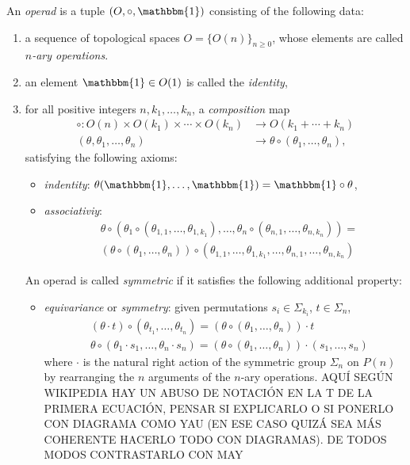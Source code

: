 \documentclass[TFM.tex]{subfiles}
\begin{document}
\begin{defi}
An \emph{operad} is a tuple $(O, \circ, \mathbbm{1})$ consisting of the following data:
\begin{enumerate}[(1)]
\item a sequence of topological spaces $O=\{O(n)\}_{n\geq 0}$, whose elements are called \emph{$n$-ary operations}.
\item an element $\mathbbm{1}\in O(1)$ is called the \emph{identity},
\item for all positive integers $n,k_1,\dots, k_n$, a \emph{composition} map
\begin{align*}
\circ:O(n)\times O(k_1)\times\cdots\times O(k_n)&\to O(k_1+\cdots+k_n)\\
(\theta, \theta_1,\dots, \theta_n)&\to \theta\circ(\theta_1,\dots, \theta_n),
\end{align*}
satisfying the following axioms:
\begin{itemize}
\item \emph{indentity}: $\theta(\mathbbm{1},\dots, \mathbbm{1})=\mathbbm{1}\circ\theta$,
\item \emph{associativiy}:
\begin{align*}
& \theta \circ (\theta_1 \circ (\theta_{1,1}, \ldots, \theta_{1,k_1}), \ldots, \theta_n \circ (\theta_{n,1}, \ldots,\theta_{n,k_n}))= \\
 {} & (\theta \circ (\theta_1, \ldots, \theta_n)) \circ (\theta_{1,1}, \ldots, \theta_{1,k_1}, \ldots, \theta_{n,1}, \ldots, \theta_{n,k_n})
\end{align*}
\end{itemize}

An operad is called \emph{symmetric} if it satisfies the following additional property:
\begin{itemize}
\item \emph{equivariance} or \emph{symmetry}: given permutations $s_i\in\Sigma_{k_i}$, $t\in\Sigma_n$,
\begin{align*}
& (\theta\cdot t)\circ(\theta_{t_1},\ldots,\theta_{t_n}) = (\theta\circ(\theta_1,\ldots,\theta_n))\cdot t \\[2pt]
& \theta\circ(\theta_1\cdot s_1,\ldots,\theta_n\cdot s_n) = (\theta\circ(\theta_1,\ldots,\theta_n))\cdot (s_1,\ldots,s_n)
\end{align*}
where $\cdot$ is the natural right action of the symmetric group $\Sigma_n$ on $P(n)$ by rearranging the $n$ arguments of the $n$-ary operations. AQUÍ SEGÚN WIKIPEDIA HAY UN ABUSO DE NOTACIÓN EN LA T DE LA PRIMERA ECUACIÓN, PENSAR SI EXPLICARLO O SI PONERLO CON DIAGRAMA COMO YAU (EN ESE CASO QUIZÁ SEA MÁS COHERENTE HACERLO TODO CON DIAGRAMAS). DE TODOS MODOS CONTRASTARLO CON MAY
\end{itemize}
\end{enumerate}
\end{defi}
\end{document}
